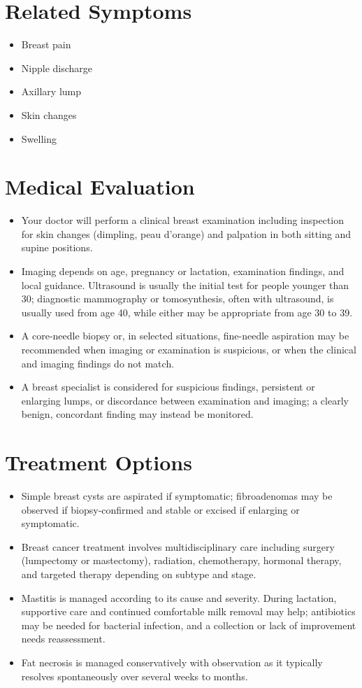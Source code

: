 \section*{Related Symptoms}
\begin{itemize}
 \item Breast pain
 \item Nipple discharge
 \item Axillary lump
 \item Skin changes
 \item Swelling
\end{itemize}

\section*{Medical Evaluation}
\begin{itemize}
 \item Your doctor will perform a clinical breast examination including inspection for skin changes (dimpling, peau d'orange) and palpation in both sitting and supine positions.
 \item Imaging depends on age, pregnancy or lactation, examination findings, and local guidance. Ultrasound is usually the initial test for people younger than 30; diagnostic mammography or tomosynthesis, often with ultrasound, is usually used from age 40, while either may be appropriate from age 30 to 39.
 \item A core-needle biopsy or, in selected situations, fine-needle aspiration may be recommended when imaging or examination is suspicious, or when the clinical and imaging findings do not match.
 \item A breast specialist is considered for suspicious findings, persistent or enlarging lumps, or discordance between examination and imaging; a clearly benign, concordant finding may instead be monitored.
\end{itemize}

\section*{Treatment Options}
\begin{itemize}
 \item Simple breast cysts are aspirated if symptomatic; fibroadenomas may be observed if biopsy-confirmed and stable or excised if enlarging or symptomatic.
 \item Breast cancer treatment involves multidisciplinary care including surgery (lumpectomy or mastectomy), radiation, chemotherapy, hormonal therapy, and targeted therapy depending on subtype and stage.
 \item Mastitis is managed according to its cause and severity. During lactation, supportive care and continued comfortable milk removal may help; antibiotics may be needed for bacterial infection, and a collection or lack of improvement needs reassessment.
 \item Fat necrosis is managed conservatively with observation as it typically resolves spontaneously over several weeks to months.
\end{itemize}

